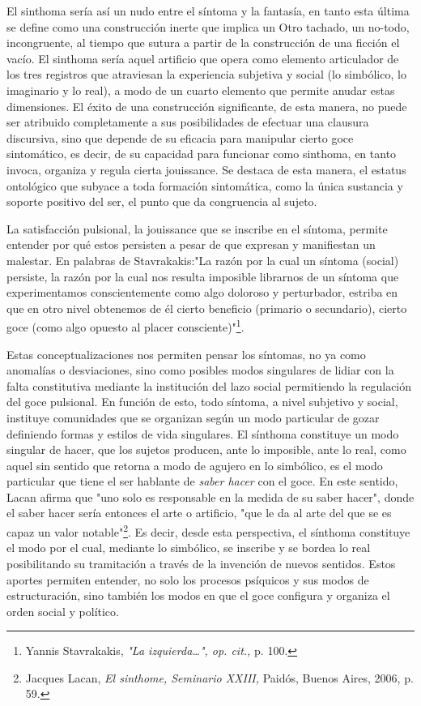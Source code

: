 El sinthoma sería así un nudo entre el síntoma y la fantasía, en tanto
esta última se define como una construcción inerte que implica un Otro
tachado, un no-todo, incongruente, al tiempo que sutura a partir de la
construcción de una ficción el vacío. El sinthoma sería aquel artificio
que opera como elemento articulador de los tres registros que atraviesan
la experiencia subjetiva y social (lo simbólico, lo imaginario y lo
real), a modo de un cuarto elemento que permite anudar estas
dimensiones. El éxito de una construcción significante, de esta manera,
no puede ser atribuido completamente a sus posibilidades de efectuar una
clausura discursiva, sino que depende de su eficacia para manipular
cierto goce sintomático, es decir, de su capacidad para funcionar como
sinthoma, en tanto invoca, organiza y regula cierta jouissance. Se
destaca de esta manera, el estatus ontológico que subyace a toda
formación sintomática, como la única sustancia y soporte positivo del
ser, el punto que da congruencia al sujeto.

La satisfacción pulsional, la jouissance que se inscribe en el síntoma,
permite entender por qué estos persisten a pesar de que expresan y
manifiestan un malestar. En palabras de Stavrakakis:"La razón por la
cual un síntoma (social) persiste, la razón por la cual nos resulta
imposible librarnos de un síntoma que experimentamos conscientemente
como algo doloroso y perturbador, estriba en que en otro nivel obtenemos
de él cierto beneficio (primario o secundario), cierto goce (como algo
opuesto al placer consciente)"\footnote{Yannis Stavrakakis, \emph{"La
  izquierda\ldots", op. cit.,} p. 100.}.

Estas conceptualizaciones nos permiten pensar los síntomas, no ya como
anomalías o desviaciones, sino como posibles modos singulares de lidiar
con la falta constitutiva mediante la institución del lazo social
permitiendo la regulación del goce pulsional. En función de esto, todo
síntoma, a nivel subjetivo y social, instituye comunidades que se
organizan según un modo particular de gozar definiendo formas y estilos
de vida singulares. El sínthoma constituye un modo singular de hacer,
que los sujetos producen, ante lo imposible, ante lo real, como aquel
sin sentido que retorna a modo de agujero en lo simbólico, es el modo
particular que tiene el ser hablante de \emph{saber hacer} con el goce.
En este sentido, Lacan afirma que "uno solo es responsable en la medida
de su saber hacer", donde el saber hacer sería entonces el arte o
artificio, "que le da al arte del que se es capaz un valor
notable"\footnote{Jacques Lacan, \emph{El sinthome, Seminario XXIII,}
  Paidós, Buenos Aires, 2006, p. 59.}. Es decir, desde esta perspectiva,
el sínthoma constituye el modo por el cual, mediante lo simbólico, se
inscribe y se bordea lo real posibilitando su tramitación a través de la
invención de nuevos sentidos. Estos aportes permiten entender, no solo
los procesos psíquicos y sus modos de estructuración, sino también los
modos en que el goce configura y organiza el orden social y político.

